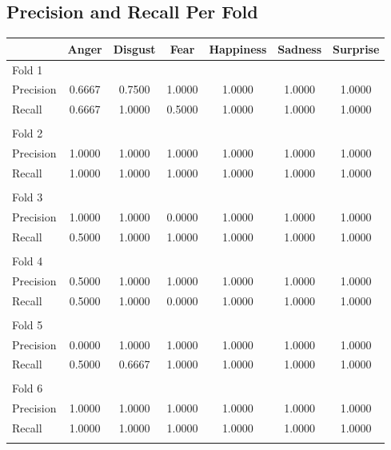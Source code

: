 \documentclass[a4paper,11pt]{article}
\begin{document}
\subsection{Precision and Recall Per Fold}
\begin{center}
\begin{tabular}{| l | c | c | c | c | c | c |} \hline
    & Anger & Disgust & Fear & Happiness & Sadness & Surprise \\ \hline
    Fold 1 &&&&&& \\ \hline
    Precision & 0.6667 & 0.7500 & 1.0000 & 1.0000 & 1.0000 & 1.0000 \\ \hline
    Recall & 0.6667 & 1.0000 & 0.5000 & 1.0000 & 1.0000 & 1.0000 \\ \hline
    &&&&&& \\ \hline
    Fold 2 &&&&&& \\ \hline
    Precision & 1.0000 & 1.0000 & 1.0000 & 1.0000 & 1.0000 & 1.0000 \\ \hline
    Recall & 1.0000 & 1.0000 & 1.0000 & 1.0000 & 1.0000 & 1.0000 \\ \hline
    &&&&&& \\ \hline
    Fold 3 &&&&&& \\ \hline
    Precision & 1.0000 & 1.0000 & 0.0000 & 1.0000 & 1.0000 & 1.0000 \\ \hline
    Recall & 0.5000 & 1.0000 & 1.0000 & 1.0000 & 1.0000 & 1.0000 \\ \hline
    &&&&&& \\ \hline
    Fold 4 &&&&&& \\ \hline
    Precision & 0.5000 & 1.0000 & 1.0000 & 1.0000 & 1.0000 & 1.0000 \\ \hline
    Recall & 0.5000 & 1.0000 & 0.0000 & 1.0000 & 1.0000 & 1.0000 \\ \hline
    &&&&&& \\ \hline
    Fold 5 &&&&&& \\ \hline
    Precision & 0.0000 & 1.0000 & 1.0000 & 1.0000 & 1.0000 & 1.0000 \\ \hline
    Recall & 0.5000 & 0.6667 & 1.0000 & 1.0000 & 1.0000 & 1.0000 \\ \hline
    &&&&&& \\ \hline
    Fold 6 &&&&&& \\ \hline
    Precision & 1.0000 & 1.0000 & 1.0000 & 1.0000 & 1.0000 & 1.0000 \\ \hline
    Recall & 1.0000 & 1.0000 & 1.0000 & 1.0000 & 1.0000 & 1.0000 \\ \hline
    &&&&&& \\ \hline

\end{tabular}
\end{center}
\end{document}
